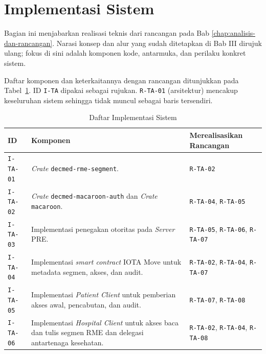 \section{Implementasi Sistem}
\label{sec:implementasi-sistem}

Bagian ini menjabarkan realisasi teknis dari rancangan pada Bab \ref{chap:analisis-dan-rancangan}. Narasi konsep dan alur yang sudah ditetapkan di Bab III dirujuk ulang; fokus di sini adalah komponen kode, antarmuka, dan perilaku konkret sistem.

Daftar komponen dan keterkaitannya dengan rancangan ditunjukkan pada Tabel~\ref{tab:daftar-implementasi-sistem}. ID \texttt{I-TA} dipakai sebagai rujukan. \texttt{R-TA-01} (arsitektur) mencakup keseluruhan sistem sehingga tidak muncul sebagai baris tersendiri.

\begin{table}[H]
	\centering
	\caption{Daftar Implementasi Sistem}
	\label{tab:daftar-implementasi-sistem}
	\small
	\begin{tabular}{|p{}|p{}|p{}|}
		\hline
		\textbf{ID}      & \textbf{Komponen}                                                                                               & \textbf{Merealisasikan Rancangan}                    \\ \hline
		\texttt{I-TA-01} & \textit{Crate} \texttt{decmed-rme-segment}.                                                                     & \texttt{R-TA-02}                                     \\ \hline
		\texttt{I-TA-02} & \textit{Crate} \texttt{decmed-macaroon-auth} dan \textit{Crate} \texttt{macaroon}.                              & \texttt{R-TA-04}, \texttt{R-TA-05}                   \\ \hline
		\texttt{I-TA-03} & Implementasi penegakan otoritas pada \textit{Server} PRE.                                                       & \texttt{R-TA-05}, \texttt{R-TA-06}, \texttt{R-TA-07} \\ \hline
		\texttt{I-TA-04} & Implementasi \textit{smart contract} IOTA Move untuk metadata segmen, akses, dan audit.                         & \texttt{R-TA-02}, \texttt{R-TA-04}, \texttt{R-TA-07} \\ \hline
		\texttt{I-TA-05} & Implementasi \textit{Patient Client} untuk pemberian akses awal, pencabutan, dan audit.                         & \texttt{R-TA-07}, \texttt{R-TA-08}                   \\ \hline
		\texttt{I-TA-06} & Implementasi \textit{Hospital Client} untuk akses baca dan tulis segmen RME dan delegasi antartenaga kesehatan. & \texttt{R-TA-02}, \texttt{R-TA-04}, \texttt{R-TA-08} \\ \hline
	\end{tabular}
\end{table}


